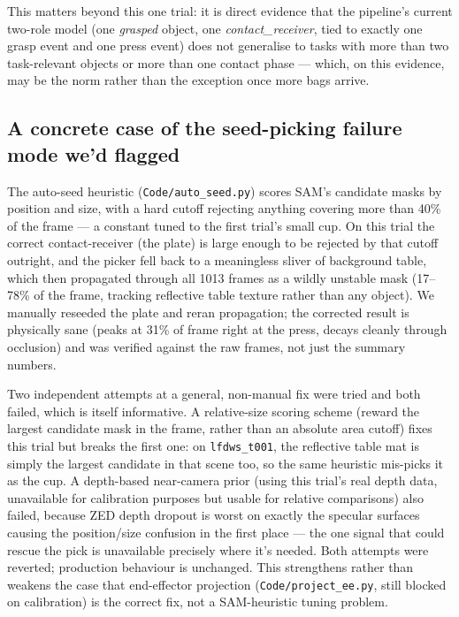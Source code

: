 \documentclass[11pt]{article}
\begin{document}
This matters beyond this one trial: it is direct evidence that the
pipeline's current two-role model (one \textit{grasped} object, one
\textit{contact\_receiver}, tied to exactly one grasp event and one press
event) does not generalise to tasks with more than two task-relevant objects
or more than one contact phase --- which, on this evidence, may be the norm
rather than the exception once more bags arrive.

\subsection{A concrete case of the seed-picking failure mode we'd flagged}

The auto-seed heuristic (\texttt{Code/auto\_seed.py}) scores SAM's candidate
masks by position and size, with a hard cutoff rejecting anything covering
more than 40\% of the frame --- a constant tuned to the first trial's small
cup. On this trial the correct contact-receiver (the plate) is large enough
to be rejected by that cutoff outright, and the picker fell back to a
meaningless sliver of background table, which then propagated through all
1013 frames as a wildly unstable mask (17--78\% of the frame, tracking
reflective table texture rather than any object). We manually reseeded the
plate and reran propagation; the corrected result is physically sane (peaks
at 31\% of frame right at the press, decays cleanly through occlusion) and
was verified against the raw frames, not just the summary numbers.

Two independent attempts at a general, non-manual fix were tried and both
failed, which is itself informative. A relative-size scoring scheme (reward
the largest candidate mask in the frame, rather than an absolute area cutoff)
fixes this trial but breaks the first one: on \texttt{lfdws\_t001}, the
reflective table mat is simply the largest candidate in that scene too, so
the same heuristic mis-picks it as the cup. A depth-based near-camera prior
(using this trial's real depth data, unavailable for calibration purposes but
usable for relative comparisons) also failed, because ZED depth dropout is
worst on exactly the specular surfaces causing the position/size confusion in
the first place --- the one signal that could rescue the pick is unavailable
precisely where it's needed. Both attempts were reverted; production
behaviour is unchanged. This strengthens rather than weakens the case that
end-effector projection (\texttt{Code/project\_ee.py}, still blocked on
calibration) is the correct fix, not a SAM-heuristic tuning problem.
\end{document}
